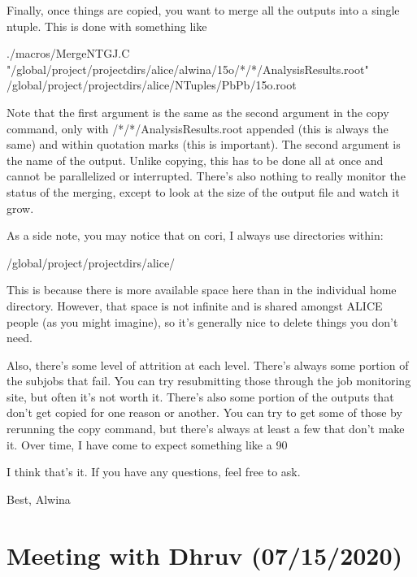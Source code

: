 \documentclass[12pt]{article}
\begin{document}
Finally, once things are copied, you want to merge all the outputs into a single ntuple. This is done with something like

\begin{tcolorbox}
\begin{verbnobox}[\tiny]
./macros/MergeNTGJ.C "/global/project/projectdirs/alice/alwina/15o/*/*/AnalysisResults.root" /global/project/projectdirs/alice/NTuples/PbPb/15o.root
\end{verbnobox}  
\end{tcolorbox}

Note that the first argument is the same as the second argument in the copy command, only with /*/*/AnalysisResults.root appended (this is always the same) and within quotation marks (this is important). The second argument is the name of the output. Unlike copying, this has to be done all at once and cannot be parallelized or interrupted. There's also nothing to really monitor the status of the merging, except to look at the size of the output file and watch it grow.

As a side note, you may notice that on cori, I always use directories within:

\begin{tcolorbox}
\begin{verbnobox}[\tiny]
/global/project/projectdirs/alice/
\end{verbnobox}  
\end{tcolorbox}

This is because there is more available space here than in the individual home directory. However, that space is not infinite and is shared amongst ALICE people (as you might imagine), so it's generally nice to delete things you don't need.

Also, there's some level of attrition at each level. There's always some portion of the subjobs that fail. You can try resubmitting those through the job monitoring site, but often it's not worth it. There's also some portion of the outputs that don't get copied for one reason or another. You can try to get some of those by rerunning the copy command, but there's always at least a few that don't make it. Over time, I have come to expect something like a 90%

I think that's it. If you have any questions, feel free to ask.

Best,
Alwina

\section{Meeting with Dhruv (07/15/2020)}
\end{document}
